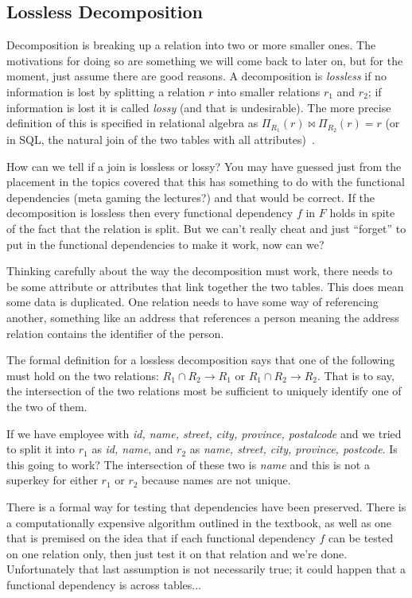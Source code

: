 \subsection*{Lossless Decomposition}

Decomposition is breaking up a relation into two or more smaller ones. The motivations for doing so are something we will come back to later on, but for the moment, just assume there are good reasons. A decomposition is \textit{lossless} if no information is lost by splitting a relation $r$ into smaller relations $r_{1}$ and $r_{2}$; if information is lost it is called \textit{lossy} (and that is undesirable). The more precise definition of this is specified in relational algebra as $\Pi_{R_{1}}(r) \bowtie \Pi_{R_{2}}(r) = r$ (or in SQL, the natural join of the two tables with all attributes)~\cite{dsc}. 

How can we tell if a join is lossless or lossy? You may have guessed just from the placement in the topics covered that this has something to do with the functional dependencies (meta gaming the lectures?) and that would be correct. If the decomposition is lossless then every functional dependency $f$ in $F$ holds in spite of the fact that the relation is split. But we can't really cheat and just ``forget'' to put in the functional dependencies to make it work, now can we?

Thinking carefully about the way the decomposition must work, there needs to be some attribute or attributes that link together the two tables. This does mean some data is duplicated. One relation needs to have some way of referencing another, something like an address that references a person meaning the address relation contains the identifier of the person. 

The formal definition for a lossless decomposition says that one of the following must hold on the two relations: $R_{1} \cap R_{2} \rightarrow R_{1}$ or  $R_{1} \cap R_{2} \rightarrow R_{2}$. That is to say, the intersection of the two relations most be sufficient to uniquely identify one of the two of them. 

If we have employee with \textit{id, name, street, city, province, postalcode} and we tried to split it into $r_{1}$ as \textit{id, name}, and $r_{2}$ as \textit{name, street, city, province, postcode}. Is this going to work? The intersection of these two is \textit{name} and this is not a superkey for either $r_{1}$ or $r_{2}$ because names are not unique.

There is a formal way for testing that dependencies have been preserved. There is a computationally expensive algorithm outlined in the textbook, as well as one that is premised on the idea that if each functional dependency $f$ can be tested on one relation only, then just test it on that relation and we're done. Unfortunately that last assumption is not necessarily true; it could happen that a functional dependency is across tables...

